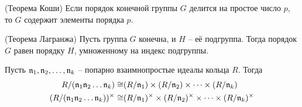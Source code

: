 \documentclass[_dissertation.tex]{subfiles}
\begin{document}
\begin{statement}\label{statement:cauchy}(Теорема Коши)
    Если порядок конечной группы $G$ делится на простое число $p$, то $G$ содержит элементы порядка $p$.
\end{statement}

\begin{statement}\label{statement:lagrange}(Теорема Лагранжа)
    Пусть группа $G$ конечна, и $H$ -- её подгруппа.
    Тогда порядок $G$ равен порядку $H$, умноженному на индекс подгруппы.
\end{statement}

\begin{statement}\label{statement:chinese_remainder_theorem}
    Пусть $\mathfrak{n}_1, \mathfrak{n}_2, \dots, \mathfrak{n}_k$ -- попарно взаимнопростые идеалы кольца $R$.
    Тогда
    \begin{equation*}
        \begin{split}
            R/(\mathfrak{n}_1\mathfrak{n}_2\dots\mathfrak{n}_k) \cong & (R/\mathfrak{n}_1) \times (R/\mathfrak{n}_2) \times \dots \times (R/\mathfrak{n}_k)\\
            (R/(\mathfrak{n}_1\mathfrak{n}_2\dots\mathfrak{n}_k))^{\times} \cong & (R/\mathfrak{n}_1)^{\times} \times (R/\mathfrak{n}_2)^{\times} \times \dots \times (R/\mathfrak{n}_k)^{\times}
        \end{split}
    \end{equation*}
\end{statement}

\onlyinsubfile{
    
    
}
\end{document}
